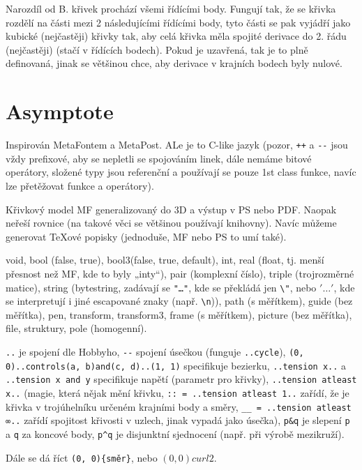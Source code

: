 \documentclass[12pt]{article}					%
\begin{document}
    \begin{definice}[Splines]
        Narozdíl od B. křivek prochází všemi řídícími body. Fungují tak, že se křivka rozdělí na části mezi 2 následujícími řídícími body, tyto části se pak vyjádří jako kubické (nejčastěji) křivky tak, aby celá křivka měla spojité derivace do 2. řádu (nejčastěji) (stačí v řídících bodech). Pokud je uzavřená, tak je to plně definovaná, jinak se většinou chce, aby derivace v krajních bodech byly nulové.
    \end{definice}


\section{Asymptote}
    \begin{definice}[Asymptote]
        Inspirován MetaFontem a MetaPost. ALe je to C-like jazyk (pozor, \verb|++| a \verb|--| jsou vždy prefixové, aby se nepletli se spojováním linek, dále nemáme bitové operátory, složené typy jsou referenční a používají se pouze 1st class funkce, navíc lze přetěžovat funkce a operátory).

        Křivkový model MF generalizovaný do 3D a výstup v PS nebo PDF. Naopak neřeší rovnice (na takové věci se většinou používají knihovny). Navíc můžeme generovat TeXové popisky (jednoduše, MF nebo PS to umí také).
    \end{definice}

    \begin{definice}[Typy]
        void, bool (false, true), bool3(false, true, default), int, real (float, tj. menší přesnost než MF, kde to byly „inty“), pair (komplexní číslo), triple (trojrozměrné matice), string (bytestring, zadávají se \verb|"…"|, kde se překládá jen \verb|\"|, nebo $'…'$, kde se interpretují i jiné escapované znaky (např. \verb|\n|)), path (s měřítkem), guide (bez měřítka), pen, transform, transform3, frame (s měřítkem), picture (bez měřítka), file, struktury, pole (homogenní).
    \end{definice}

    \begin{definice}
        \verb|..| je spojení dle Hobbyho, \verb|--| spojení úsečkou (funguje \verb|..cycle|), \verb|(0, 0)..controls(a, b)and(c, d)..(1, 1)| specifikuje bezierku, \verb|..tension x..| a \verb|..tension x and y| specifikuje napětí (parametr pro křivky), \verb|..tension atleast x..| (magie, která nějak mění křivku, \verb|:: = ..tension atleast 1..| zařídí, že je křivka v trojúhelníku určeném krajními body a směry, \verb|__ = ..tension atleast ∞..| zařídí spojitost křivosti v uzlech, jinak vypadá jako úsečka), \verb|p&q| je slepení \verb|p| a \verb|q| za koncové body, \verb|p^q| je disjunktní sjednocení (např. při výrobě mezikruží).

        Dále se dá říct \verb|(0, 0){směr}|, nebo $(0, 0){curl2}$.
    \end{definice}
\end{document}
